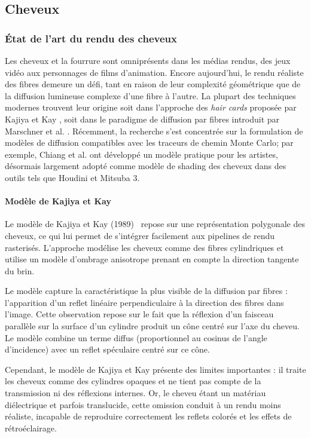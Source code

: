 \subsection{Cheveux}

\subsubsection{État de l'art du rendu des cheveux}

Les cheveux et la fourrure sont omniprésents dans les médias rendus, des jeux vidéo aux personnages de films d'animation. Encore aujourd'hui, le rendu réaliste des fibres demeure un défi, tant en raison de leur complexité géométrique que de la diffusion lumineuse complexe d'une fibre à l'autre. La plupart des techniques modernes trouvent leur origine soit dans l'approche des \textit{hair cards} proposée par Kajiya et Kay \cite{kajiya1989rendering}, soit dans le paradigme de diffusion par fibres introduit par Marschner et al. \cite{marschner2003}. Récemment, la recherche s'est concentrée sur la formulation de modèles de diffusion compatibles avec les traceurs de chemin Monte Carlo; par exemple, Chiang et al. \cite{chiang2016} ont développé un modèle pratique pour les artistes, désormais largement adopté comme modèle de shading des cheveux dans des outils tels que Houdini et Mitsuba 3.

\paragraph{Modèle de Kajiya et Kay}

Le modèle de Kajiya et Kay (1989)~\cite{kajiya1989rendering} repose sur une représentation polygonale des cheveux, ce qui lui permet de s'intégrer facilement aux pipelines de rendu rasterisés. L'approche modélise les cheveux comme des fibres cylindriques et utilise un modèle d'ombrage anisotrope prenant en compte la direction tangente du brin.

Le modèle capture la caractéristique la plus visible de la diffusion par fibres : l'apparition d'un reflet linéaire perpendiculaire à la direction des fibres dans l'image. Cette observation repose sur le fait que la réflexion d'un faisceau parallèle sur la surface d'un cylindre produit un cône centré sur l'axe du cheveu. Le modèle combine un terme diffus (proportionnel au cosinus de l'angle d'incidence) avec un reflet spéculaire centré sur ce cône.

Cependant, le modèle de Kajiya et Kay présente des limites importantes : il traite les cheveux comme des cylindres opaques et ne tient pas compte de la transmission ni des réflexions internes. Or, le cheveu étant un matériau diélectrique et parfois translucide, cette omission conduit à un rendu moins réaliste, incapable de reproduire correctement les reflets colorés et les effets de rétroéclairage.

